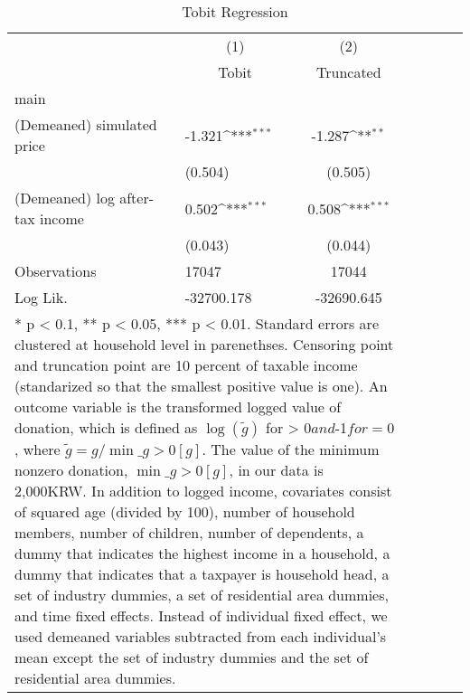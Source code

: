\begin{table}[htbp]\centering
\def\sym#1{\ifmmode^{#1}\else\(^{#1}\)\fi}
\caption{Tobit Regression}
\begin{tabular}{l*{2}{lcc}}
\toprule
                    &\multicolumn{1}{c}{(1)}&\multicolumn{1}{c}{(2)}\\
                    &\multicolumn{1}{c}{Tobit}&\multicolumn{1}{c}{Truncated}\\
\midrule
main                &                     &                     \\
(Demeaned) simulated price&      -1.321\sym{***}&      -1.287\sym{**} \\
                    &     (0.504)         &     (0.505)         \\
(Demeaned) log after-tax income&       0.502\sym{***}&       0.508\sym{***}\\
                    &     (0.043)         &     (0.044)         \\
\midrule
Observations        &       17047         &       17044         \\
Log Lik.            &  -32700.178         &  -32690.645         \\
\bottomrule
\multicolumn{3}{l}{\footnotesize \parbox{15cm}{* p < 0.1, ** p < 0.05, *** p < 0.01. Standard errors are clustered at household level in parenethses. Censoring point and truncation point are 10 percent of taxable income (standarized so that the smallest positive value is one). An outcome variable is the transformed logged value of donation, which is defined as $\log(\tilde{g})$ for  > 0$ and $-1$ for =0$, where $\tilde{g}=g/\min\_{g>0}[g]$. The value of the minimum nonzero donation, $\min\_{g>0}[g]$, in our data is 2,000KRW. In addition to logged income, covariates consist of squared age (divided by 100), number of household members, number of children, number of dependents, a dummy that indicates the highest income in a household, a dummy that indicates that a taxpayer is household head, a set of industry dummies, a set of residential area dummies, and time fixed effects. Instead of individual fixed effect, we used demeaned variables subtracted from each individual's mean except the set of industry dummies and the set of residential area dummies.}}\\
\end{tabular}
\end{table}
